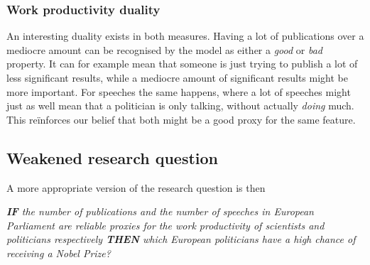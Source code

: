 \subsubsection{Work productivity duality}
An interesting duality exists in both measures. Having a lot of publications over a mediocre amount can be recognised by the model as either a \emph{good} or \emph{bad} property. It can for example mean that someone is just trying to publish a lot of less significant results, while a mediocre amount of significant results might be more important. For speeches the same happens, where a lot of speeches might just as well mean that a politician is only talking, without actually \emph{doing} much. This re\"inforces our belief that both might be a good proxy for the same feature.

\subsection{Weakened research question}
A more appropriate version of the research question is then
\begin{center}
	\emph{\textbf{\textsc{IF}} the number of publications and the number of speeches in European Parliament are reliable proxies for the work productivity of scientists and politicians respectively \textbf{\textsc{THEN}} which European politicians have a high chance of receiving a Nobel Prize?}
\end{center}


